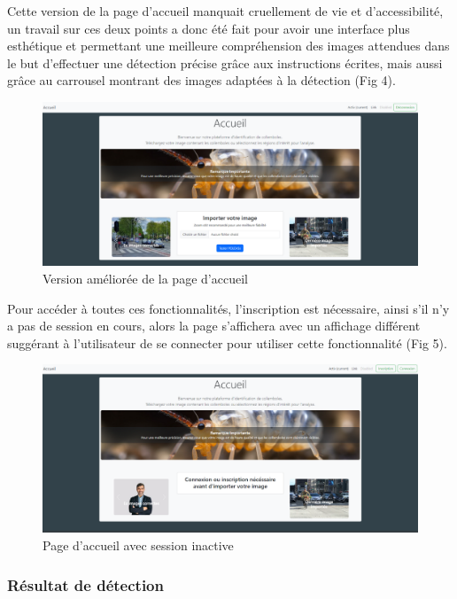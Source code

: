\documentclass[
  10pt,
]{article}
\begin{document}
Cette version de la page d'accueil manquait cruellement de vie et
d'accessibilité, un travail sur ces deux points a donc été fait pour
avoir une interface plus esthétique et permettant une meilleure
compréhension des images attendues dans le but d'effectuer une détection
précise grâce aux instructions écrites, mais aussi grâce au carrousel
montrant des images adaptées à la détection (Fig 4).

\begin{figure}[htbp]
\centering
\includegraphics[width=\textwidth]{img_rmd/fig4.png}
\caption{Version améliorée de la page d'accueil}
\end{figure}

Pour accéder à toutes ces fonctionnalités, l'inscription est nécessaire,
ainsi s'il n'y a pas de session en cours, alors la page s'affichera avec
un affichage différent suggérant à l'utilisateur de se connecter pour
utiliser cette fonctionnalité (Fig 5).

\begin{figure}[htbp]
\centering
\includegraphics[width=\textwidth]{img_rmd/fig5.png}
\caption{Page d'accueil avec session inactive}
\end{figure}

\newpage

\subsubsection{Résultat de détection}\label{ruxe9sultat-de-duxe9tection}
\end{document}
